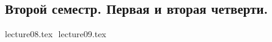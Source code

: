 \documentclass[12pt,letterpaper]{report}
\theoremstyle{definition}
\begin{document}
\newpage
\pagestyle{plain}
\fi
\tableofcontents
\newpage
\begin{normalsize}
\chapter*{Второй семестр. Первая и вторая четверти.}
{lecture08.tex}
$ $
{lecture09.tex}
$ $
\end{normalsize}
\end{document}
